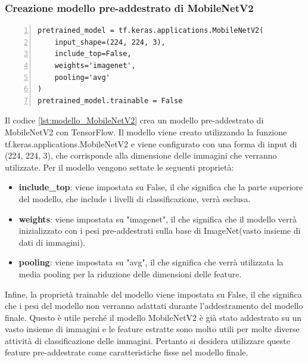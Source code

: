 \documentclass[a4paper,final,12pt]{report}
\begin{document}
\subsubsection{Creazione modello pre-addestrato di MobileNetV2}
\begin{lstlisting}[caption={Modello pre-addestrato di MobileNetV2t.}, label={lst:modello_MobileNetV2}, breaklines, escapechar=`\%, frame=lines, basicstyle=\small\ttfamily, keepspaces=true, numbers=left]
pretrained_model = tf.keras.applications.MobileNetV2(
    input_shape=(224, 224, 3),
    include_top=False,
    weights='imagenet',
    pooling='avg'
)
pretrained_model.trainable = False
\end{lstlisting}
Il codice \ref{lst:modello_MobileNetV2} crea un modello pre-addestrato di MobileNetV2 con TensorFlow. Il modello viene creato utilizzando la funzione tf.keras.applications.MobileNetV2 e viene configurato con una forma di input di (224, 224, 3), che corrisponde alla dimensione delle immagini che verranno utilizzate. Per il modello vengono settate le seguenti proprietà:
\begin{itemize}
    \item \textbf{include\_top}: viene impostata su False, il che significa che la parte superiore del modello, che include i livelli di classificazione, verrà esclusa.
    \item  \textbf{weights}: viene impostata su "imagenet", il che significa che il modello verrà inizializzato con i pesi pre-addestrati sulla base di ImageNet(vasto insieme di dati di immagini).
    \item  \textbf{pooling}: viene impostata su "avg", il che significa che verrà utilizzata la media pooling per la riduzione delle dimensioni delle feature.
\end{itemize}
Infine, la proprietà trainable del modello viene impostata su False, il che significa che i pesi del modello non verranno adattati durante l'addestramento del modello finale. Questo è utile perché il modello MobileNetV2 è già stato addestrato su un vasto insieme di immagini e le feature estratte sono molto utili per molte diverse attività di classificazione delle immagini. Pertanto si desidera utilizzare queste feature pre-addestrate come caratteristiche fisse nel modello finale.\\
\newpage
\end{document}
